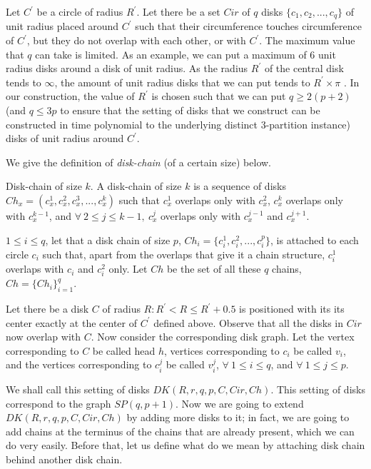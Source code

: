 Let $C^\prime$ be a circle of radius $R^\prime$. Let there be a set $Cir$ of $q$ disks $\{c_1, c_2, ..., c_q\}$ of unit radius placed around $C^\prime$ such that their circumference touches circumference of $C^\prime$, but they do not overlap with each other, or with $C^\prime$. The maximum value that $q$ can take is limited. As an example, we can put a maximum of 6 unit radius disks around a disk of unit radius. As the radius $R^\prime$ of the central disk tends to $\infty$, the amount of unit radius disks that we can put tends to $R^\prime\times\pi$ \cite{Marathe1995}. In our construction, the value of $R^\prime$ is chosen such that we can put $q\geq 2(p+2)$ (and $q\leq 3p$ to ensure that the setting of disks that we construct can be constructed in time polynomial to the underlying distinct 3-partition instance) disks of unit radius around $C^\prime$.

We give the definition of \textit{disk-chain} (of a certain size) below.
\begin{definition}\label{definition:DCSizeKDG}{Disk-chain of size} {$k$}. A disk-chain of size $k$ is a sequence of disks $Ch_x = (c_x^1, c_x^2, c_x^3, ..., c_x^k)$ such that $c_x^1$ overlaps only with $c_x^2$, $c_x^k$ overlaps only with $c_x^{k-1}$, and $\forall\ 2\leq j\leq k-1,\ c_x^j$ overlaps only with $c_x^{j-1}$ and $c_x^{j+1}$.
\end{definition}

$1\leq i\leq q$, let that a disk chain of size $p$, $Ch_i=\{c_i^1,c_i^2,...,c_i^p\}$, is attached to each circle $c_i$ such that, apart from the overlaps that give it a chain structure, $c_i^1$ overlaps with $c_i$ and $c_i^2$ only. 
Let $Ch$ be the set of all these $q$ chains, $Ch = \{Ch_i\}_{i=1}^{q}$.

Let there be a disk $C$ of radius $R: R^\prime < R \leq R^\prime + 0.5$ is positioned with its its center exactly at the center of $C^\prime$ defined above. Observe that all the disks in $Cir$ now overlap with $C$. Now consider the corresponding disk graph. Let the vertex corresponding to $C$ be called head $h$, vertices corresponding to $c_i$ be called $v_i$, and the vertices corresponding to $c_i^j$ be called $v_i^j$, $\forall\ 1 \leq i \leq q$, and $\forall\ 1 \leq j \leq p$.

We shall call this setting of disks $DK(R,r,q,p,C,Cir,Ch)$. This setting of disks correspond to the graph $SP(q,p+1)$. Now we are going to extend $DK(R,r,q,p,C,Cir,Ch)$ by adding more disks to it; in fact, we are going to add chains at the terminus of the chains that are already present, which we can do very easily. Before that, let us define what do we mean by attaching disk chain behind another disk chain.

